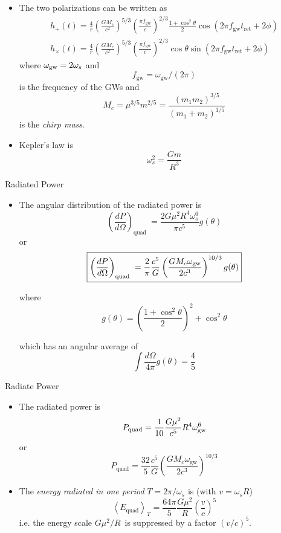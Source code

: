 \documentclass[size=11pt,style=paintings]{powerdot}
\begin{document}
\begin{slide}{}
 \begin{itemize}
 \item The two polarizations can be written as $$
\begin{array}{l}{h_{+}(t)=\frac{4}{r}\left(\frac{G M_{c}}{c^{2}}\right)^{5
/ 3}\left(\frac{\pi f_{\mathrm{gw}}}{c}\right)^{2 / 3} \frac{1+\cos ^{2}
\theta}{2} \cos \left(2 \pi f_{\mathrm{gw}} t_{\mathrm{ret}}+2 \phi\right)}
\\ {h_{\times}(t)=\frac{4}{r}\left(\frac{G M_{c}}{c^{2}}\right)^{5 / 3}\left(\frac{\pi
f_{\mathrm{gw}}}{c}\right)^{2 / 3} \cos \theta \sin \left(2 \pi f_{\mathrm{gw}}
t_{\mathrm{ret}}+2 \phi\right)}\end{array}
$$
where $\omega_{\rm gw}=2\omega_s$ and$$
f_{\mathrm{gw}}=\omega_{\mathrm{gw}} /(2 \pi)
$$
is the frequency of the GWs and 
$$
M_{c}=\mu^{3 / 5} m^{2 / 5}=\frac{\left(m_{1} m_{2}\right)^{3 / 5}}{\left(m_{1}+m_{2}\right)^{1
/ 5}}
$$
is the \textit{chirp mass}. 
\item Kepler's law is
$$
\omega_{s}^{2}=\frac{G m}{R^{3}}
$$
 \end{itemize}
 \end{slide}


\begin{slide}{Radiated Power}
 \begin{itemize}
 
 \item The angular distribution of the radiated power is
 $$
\left(\frac{d P}{d \Omega}\right)_{\text {quad }}=\frac{2 G \mu^{2} R^{4} \omega_{s}^{6}}{\pi c^{5}} g(\theta)
$$
or $$
\boxed{ \left(\frac{d P}{d \Omega}\right)_{\text {quad }}=\frac{2}{\pi} \frac{c^{5}}{G}\left(\frac{G M_{c} \omega_{\rm
g
w}}{2 c^{3}}\right)^{10 / 3} g(\theta)}
$$

where
$$
g(\theta)=\left(\frac{1+\cos ^{2} \theta}{2}\right)^{2}+\cos ^{2} \theta
$$

 which has an angular average of 
 $$
\int \frac{d \Omega}{4 \pi} g(\theta)=\frac{4}{5}
$$

\vspace{0.2cm}

 \end{itemize}
 \end{slide}




\begin{slide}{Radiate Power}
 \begin{itemize}
 \item The radiated power is
$$P_{\mathrm{quad}}=\frac{1}{10} \frac{G \mu^{2}}{c^{5}} R^{4} \omega_{\rm
gw}^{6}
$$
or 
$$
\boxed{P_{\mathrm{quad}}=\frac{32}{5} \frac{c^{5}}{G}\left(\frac{G M_{c} \omega_{\mathrm{gw}}}{2
c^{3}}\right)^{10 / 3}}
$$
 \item The \textit{energy radiated in one period} $T=2\pi/\omega_s$ is (with $v=\omega_sR$)
$$
\left\langle E_{\mathrm{quad}}\right\rangle_{T}=\frac{64 \pi}{5} \frac{G
\mu^{2}}{R}\left(\frac{v}{c}\right)^{5}
$$
i.e. the energy scale $G\mu^2/R$\ is suppressed by a factor $(v/c)^5$.
 

 \end{itemize}
 \end{slide}
\end{document}
